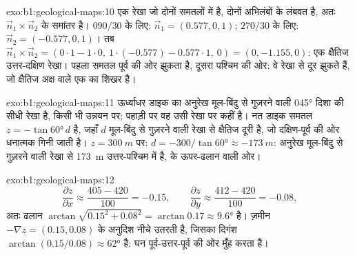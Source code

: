 \begin{solution}{exo:b1:geological-maps:10}
एक रेखा जो दोनों समतलों में है, दोनों अभिलंबों के लंबवत है, अतः $\vec n_1 \times \vec n_2$ के समांतर है। $090/30$
के लिए: $\vec n_1 = (0.577, 0,
1)$; $270/30$ के लिए: $\vec n_2 = (-0.577, 0, 1)$। तब $\vec n_1 \times \vec n_2
= (0\cdot 1 - 1\cdot 0,\ 1\cdot(-0.577) - 0.577\cdot 1,\ 0) = (0, -1.155,
0)$: एक क्षैतिज उत्तर-दक्षिण रेखा। पहला समतल पूर्व की ओर झुकता है, दूसरा पश्चिम की ओर: वे रेखा से दूर झुकते
हैं, जो क्षैतिज अक्ष वाले एक  का शिखर है।
\end{solution}

\begin{solution}{exo:b1:geological-maps:11}
ऊर्ध्वाधर डाइक का अनुरेख मूल-बिंदु से गुज़रने वाली \ang{045} दिशा की सीधी रेखा है, किसी भी उन्नयन पर; पहाड़ी पर वह
उसी रेखा पर कहीं है। नत डाइक समतल $z = -\tan\ang{60}\,d$ है, जहाँ $d$ मूल-बिंदु से गुज़रने वाली  रेखा से
क्षैतिज दूरी है, जो दक्षिण-पूर्व की ओर धनात्मक गिनी जाती है। $z = \qty{300}{m}$ पर: $d = -300/\tan\ang{60}
\approx \qty{-173}{m}$: अनुरेख मूल-बिंदु से गुज़रने वाली  रेखा से \qty{173}{m} उत्तर-पश्चिम में है,  के
ऊपर-ढलान वाली ओर।
\end{solution}

\begin{solution}{exo:b1:geological-maps:12}
\[
  \frac{\partial z}{\partial x} \approx \frac{405 - 420}{100} = -0.15, \qquad
  \frac{\partial z}{\partial y} \approx \frac{412 - 420}{100} = -0.08,
\]
अतः ढलान $\arctan\sqrt{0.15^2 + 0.08^2} = \arctan 0.17 \approx
\ang{9.6}$ है। ज़मीन $-\nabla z = (0.15, 0.08)$ के अनुदिश नीचे उतरती है, जिसका दिगंश
$\arctan(0.15/0.08) \approx \ang{62}$ है: घन पूर्व-उत्तर-पूर्व की ओर मुँह करता है।
\end{solution}

